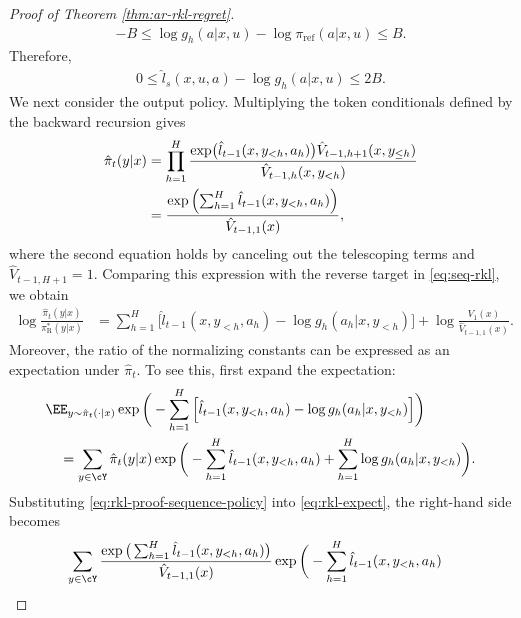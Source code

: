 \documentclass[11pt]{article}
\newcommand{\pir}{\pi_{\mathrm{R}}}
\newcommand{\piref}{\pi_{\text{ref}}}
\begin{document}
\begin{proof}[Proof of Theorem \ref{thm:ar-rkl-regret}]
\begin{align*}
    -B
    \leq
    \log g_h(a|x,u)-\log\piref(a|x,u)
    \leq B.
\end{align*}
Therefore,
\begin{align*}
    0
    \leq
    \hat l_s(x,u,a)-\log g_h(a|x,u)
    \leq2B.
\end{align*}
We next consider the output policy. Multiplying the token conditionals defined by the backward recursion gives
\begin{align}
    \hat\pi_t(y|x)
    &=
    \prod_{h=1}^H
    \frac{
        \exp\bigl(\hat l_{t-1}(x,y_{<h},a_h)\bigr)
        \hat V_{t-1,h+1}(x,y_{\leq h})
    }{
        \hat V_{t-1,h}(x,y_{<h})
    }\notag\\
    &=
    \frac{
        \exp\left(
            \sum_{h=1}^H
            \hat l_{t-1}(x,y_{<h},a_h)
        \right)
    }{
        \hat V_{t-1,1}(x)
    },\label{eq:rkl-proof-sequence-policy}
\end{align}
where the second equation holds by canceling out the telescoping terms and
$\hat V_{t-1,H+1}=1$. Comparing this expression with the reverse target
in \eqref{eq:seq-rkl}, we obtain
\begin{align}
    \log\frac{\hat\pi_t(y|x)}{\pir^*(y|x)}
    &=
    \sum_{h=1}^H
    \Big[
        \hat l_{t-1}(x,y_{<h},a_h)
        -
        \log g_h(a_h|x,y_{<h})
    \Big]+
    \log\frac{V_1(x)}{\hat V_{t-1,1}(x)}.
    \label{eq:rkl-proof-sequence-ratio}
\end{align}
Moreover, the ratio of the normalizing constants can be expressed as an expectation under $\hat\pi_t$. To see this, first expand the expectation:
\begin{align}
\notag
    &\EE_{y\sim\hat\pi_t(\cdot|x)}
    \exp\bigg(
        -\sum_{h=1}^H
        \Big[
            \hat l_{t-1}(x,y_{<h},a_h)
            -
            \log g_h(a_h|x,y_{<h})
        \Big]
    \bigg)\\\label{eq:rkl-expect}
    &\quad=
    \sum_{y\in\cY}
    \hat\pi_t(y|x)
    \exp\bigg(
        -\sum_{h=1}^H\hat l_{t-1}(x,y_{<h},a_h)
        +
        \sum_{h=1}^H\log g_h(a_h|x,y_{<h})
    \bigg).
\end{align}
Substituting
\eqref{eq:rkl-proof-sequence-policy} into \eqref{eq:rkl-expect}, the right-hand side becomes
\begin{align*}
    &\sum_{y\in\cY}
    \frac{
        \exp\big(
            \sum_{h=1}^H\hat l_{t-1}(x,y_{<h},a_h)
        \big)
    }{
        \hat V_{t-1,1}(x)
    }
    \exp\bigg(
        -\sum_{h=1}^H\hat l_{t-1}(x,y_{<h},a_h)

\end{align*}
\end{proof}
\end{document}

